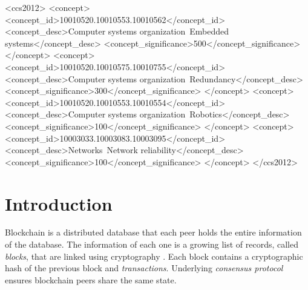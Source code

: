 \documentclass[sigplan,screen]{acmart}
\begin{document}
\begin{abstract}
\end{abstract}

\begin{CCSXML}
<ccs2012>
 <concept>
  <concept_id>10010520.10010553.10010562</concept_id>
  <concept_desc>Computer systems organization~Embedded systems</concept_desc>
  <concept_significance>500</concept_significance>
 </concept>
 <concept>
  <concept_id>10010520.10010575.10010755</concept_id>
  <concept_desc>Computer systems organization~Redundancy</concept_desc>
  <concept_significance>300</concept_significance>
 </concept>
 <concept>
  <concept_id>10010520.10010553.10010554</concept_id>
  <concept_desc>Computer systems organization~Robotics</concept_desc>
  <concept_significance>100</concept_significance>
 </concept>
 <concept>
  <concept_id>10003033.10003083.10003095</concept_id>
  <concept_desc>Networks~Network reliability</concept_desc>
  <concept_significance>100</concept_significance>
 </concept>
</ccs2012>
\end{CCSXML}


\keywords{}

\maketitle

\section{Introduction}

Blockchain is a distributed database \cite{crosby2016blockchain}
that each peer holds the entire information of the database.
The information of each one is a growing list of records, called \textit{blocks},
that are linked using cryptography \cite{blockchainwikidef}.
Each block contains a cryptographic hash of the previous block and
\textit{transactions}.
Underlying \textit{consensus protocol} \cite{gilad2017algorand,kiayias2017ouroboros,hanke2018dfinity}
ensures blockchain peers share the same state.
\end{document}
